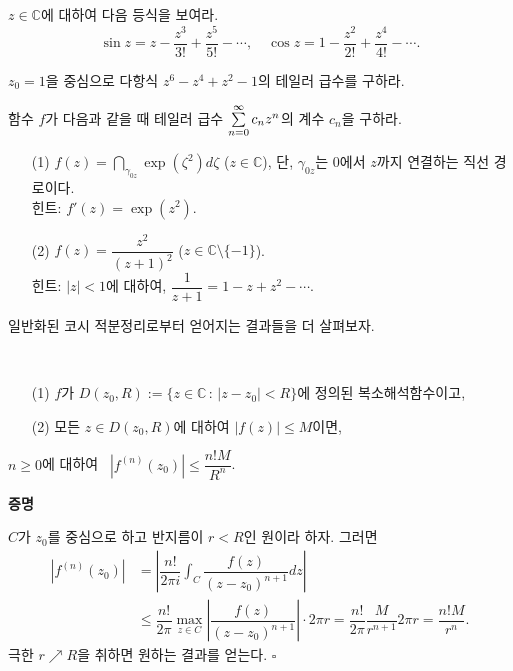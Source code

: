 \begin{salt_exercise} \label{ex-4-12}
$z\in\mathbb C$에 대하여 다음 등식을 보여라.
\[
\sin z = z - \dfrac{z^3}{3!} + \dfrac{z^5}{5!} - \cdots,
\quad
\cos z = 1 - \dfrac{z^2}{2!} + \dfrac{z^4}{4!} - \cdots.
\]
\end{salt_exercise}

\begin{salt_exercise} \label{ex-4-13}
$z_0=1$을 중심으로
다항식 $z^6-z^4 + z^2 -1$의 테일러 급수를 구하라.
\end{salt_exercise}

\begin{salt_exercise} \label{ex-4-14}
함수 $f$가 다음과 같을 때 테일러 급수 $\sum\limits_{n=0}^\infty c_nz^n$의 계수 $c_n$을 구하라.
\begin{itemize}
\item[(1)] $f(z) = \dint_{\gamma_{0z}} \exp(\zeta^2)d\zeta$ ($z\in\mathbb C$),
단, $\gamma_{0z}$는 $0$에서 $z$까지 연결하는 직선 경로이다. \\
힌트: $f'(z) = \exp(z^2)$.
\item[(2)] $f(z) = \dfrac{z^2}{(z+1)^2}$ ($z\in \mathbb C\setminus \{-1\}$). \\
힌트: $|z|<1$에 대하여, $\dfrac1{z+1} = 1- z + z^2 - \cdots$.
\end{itemize}
\end{salt_exercise}

일반화된 코시 적분정리로부터 얻어지는 결과들을 더 살펴보자.

\begin{salt_corollary}[코시 부등식] \label{coro-4-5}
\ 
\begin{itemize}
\item[(1)] $f$가 $D(z_0, R):= \{z \in \mathbb C\,:\, |z-z_0| <R \}$에 정의된
복소해석함수이고,
\item[(2)] 모든 $z\in D(z_0,R)$에 대하여 $|f(z)|\le M$이면,
\end{itemize}
$n\ge0$에 대하여  \ $|f^{(n)}(z_0)| \le \dfrac{n! M}{R^n}$.
\end{salt_corollary}

{\bf 증명}

$C$가 $z_0$를 중심으로 하고 반지름이 $r<R$인 원이라 하자. 그러면
\begin{align*}
|f^{(n)}(z_0)| &= \left| \dfrac{n!}{2\pi i} \int_C \dfrac{f(z)}{(z-z_0)^{n+1}}dz \right| \\
&\le \dfrac{n!}{2\pi} \max_{z\in C} \left| \dfrac{f(z)}{(z-z_0)^{n+1}} \right| \cdot 
2\pi r = \dfrac{n!}{2\pi} \dfrac{M}{r^{n+1}}2\pi r = \dfrac{n! M}{r^n}.
\end{align*}
극한 $r\nearrow R$을 취하면 원하는 결과를 얻는다. 
\hfill $\square$

